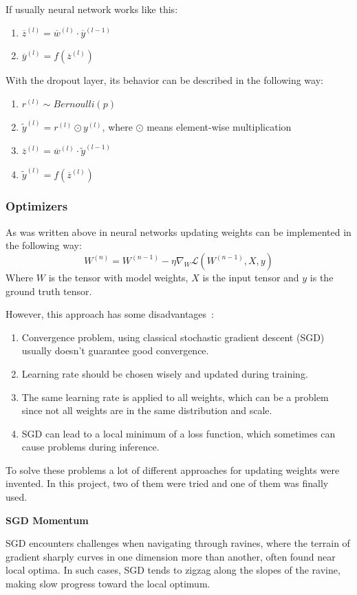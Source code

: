 If usually neural network works like this:
\begin{enumerate}
    \item $\overline{z}^{(l)} = \overline{w}^{(l)}\cdot \overline{y}^{(l-1)}$
    \item $\overline{y}^{(l)} = f(\overline{z}^{(l)})$
\end{enumerate}
With the dropout layer, its behavior can be described in the following way:
\begin{enumerate}
    \item $r^{(l)} \sim Bernoulli(p)$
    \item $\tilde{y}^{(l)} = r^{(l)} \odot y^{(l)}$, where $\odot$ means element-wise multiplication
    \item $\overline{z}^{(l)} = \overline{w}^{(l)}\cdot {\tilde{y}}^{(l-1)}$
    \item $\tilde{y}^{(l)} = f(\overline{z}^{(l)})$
\end{enumerate}

\subsubsection{Optimizers}
As was written above in neural networks updating weights can be implemented in the following way:
\[W^{(n)} = W^{(n-1)} - \eta \nabla_W \mathcal{L}(W^{(n-1)}, X, y)\]
Where $W$ is the tensor with model weights, $X$ is the input tensor and $y$ is the ground truth tensor.

However, this approach has some disadvantages~\cite{sgd}:
\begin{enumerate}
    \item Convergence problem, using classical stochastic gradient descent (SGD) usually doesn't guarantee good convergence.
    \item Learning rate should be chosen wisely and updated during training.
    \item The same learning rate is applied to all weights, which can be a problem since not all weights are in the same distribution and scale.
    \item SGD can lead to a local minimum of a loss function, which sometimes can cause problems during inference.
\end{enumerate}
To solve these problems a lot of different approaches for updating weights were invented. In this project, two of them were tried and one of them was finally used.

\textbf{SGD Momentum}

SGD encounters challenges when navigating through ravines, where the terrain of gradient sharply curves in one dimension more than another, 
often found near local optima. In such cases, SGD tends to zigzag along the slopes of the ravine, making slow progress toward the local optimum. 

